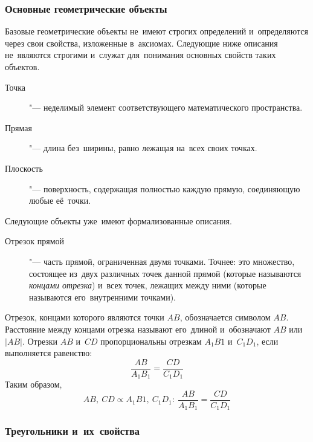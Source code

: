\documentclass[]{scrartcl}
\begin{document}
\subsubsection{Основные геометрические объекты}\label{main-figures}
Базовые геометрические объекты не~имеют строгих определений и~определяются через свои свойства, изложенные в~аксиомах. Следующие ниже описания не~являются строгими и~служат для~понимания основных свойств таких объектов.
\begin{description}
	\item[Точка] "--- неделимый элемент соответствующего математического пространства.
\end{description}
\begin{description}
	\item[Прямая] "--- длина без~ширины, равно лежащая на~всех своих точках.
\end{description}
\begin{description}
	\item[Плоскость] "--- поверхность, содержащая полностью каждую прямую, соединяющую любые её~точки.
\end{description}
Следующие объекты уже~имеют формализованные описания.
\begin{description}
	\item[Отрезок прямой] "--- часть прямой, ограниченная двумя точками. Точнее: это множество, состоящее из~двух различных точек данной прямой (которые называются \emph{концами отрезка}) и~всех точек, лежащих между ними (которые называются его~внутренними точками).
\end{description}
Отрезок, концами которого являются точки  ${\displaystyle A} {\displaystyle B}$, обозначается символом ${\displaystyle AB}$. Расстояние между концами отрезка называют его~длиной и~обозначают ${\displaystyle AB}$ или~${\displaystyle |AB|}$.
Отрезки ${\displaystyle AB}$ и~${\displaystyle CD}$ пропорциональны отрезкам ${\displaystyle A_{1}B{1}}$ и~${\displaystyle C_{1}D_{1}}$, если выполняется равенство:
\begin{equation}\label{eq:prog-segments-1}
\frac{AB}{A_{1}B_{1}} = \frac{CD}{C_{1}D_{1}}
\end{equation}
Таким образом,
\begin{equation}\label{eq:prog-segments-2}
AB,\ CD \propto A_{1}B{1},\ C_{1}D_{1}:\ \frac{AB}{A_{1}B_{1}} = \frac{CD}{C_{1}D_{1}} 
\end{equation}



\subsubsection{Треугольники и~их~свойства}\label{triangles}
\end{document}
